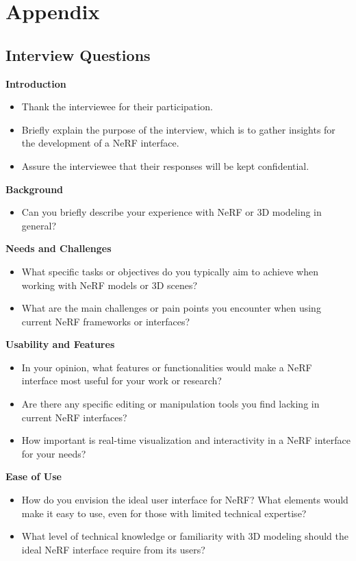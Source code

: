 %
\chapter{Appendix}
\label{sec:appendix}

\section{Interview Questions}
\label{sec:appendix:interview-questions}

\textbf{Introduction}
\begin{itemize}
\item Thank the interviewee for their participation.
\item Briefly explain the purpose of the interview, which is to gather insights for the development of a NeRF interface.
\item Assure the interviewee that their responses will be kept confidential.
\end{itemize}

\textbf{Background}
\begin{itemize}
\item Can you briefly describe your experience with NeRF or 3D modeling in general?
\end{itemize}

\textbf{Needs and Challenges}
\begin{itemize}
\item What specific tasks or objectives do you typically aim to achieve when working with NeRF models or 3D scenes?
\item What are the main challenges or pain points you encounter when using current NeRF frameworks or interfaces?
\end{itemize}

\textbf{Usability and Features}
\begin{itemize}
\item In your opinion, what features or functionalities would make a NeRF interface most useful for your work or research?
\item Are there any specific editing or manipulation tools you find lacking in current NeRF interfaces?
\item How important is real-time visualization and interactivity in a NeRF interface for your needs?
\end{itemize}

\textbf{Ease of Use}
\begin{itemize}
\item How do you envision the ideal user interface for NeRF? What elements would make it easy to use, even for those with limited technical expertise?
\item What level of technical knowledge or familiarity with 3D modeling should the ideal NeRF interface require from its users?
\end{itemize}

